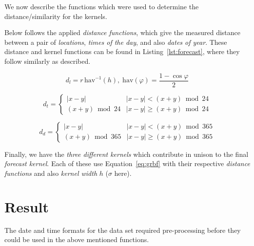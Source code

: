 \documentclass[a4paper, twocolumn]{article}
\begin{document}
    We now describe the functions which were used to determine the distance/similarity for the kernels.

    Below follows the applied \emph{distance functions}, which give the measured distance between a pair of \emph{locations}, \emph{times of the day}, and also \emph{dates of year}. These distance and kernel functions can be found in Listing~\ref{lst:forecast}, where they follow similarly as described.

    \begin{equation*} \label{eq:location}
    d_l = r\, \mathrm{hav}^{-1}(h),\; \mathrm{hav}(\varphi) = \frac{1 - \cos\varphi}{2}
    \end{equation*}
    
    
    
    \begin{equation*} \label{eq:time}
    d_t = \begin{cases}
    |x - y| & |x - y| < (x + y) \bmod 24\\
    (x + y) \bmod 24 & |x - y| \geq (x + y) \bmod 24
    \end{cases}
    \end{equation*}

   

    \begin{equation*} \label{eq:day}
    d_d = \begin{cases}
    |x - y| & |x - y| < (x + y) \bmod 365\\
    (x + y) \bmod 365 & |x - y| \geq (x + y) \bmod 365
    \end{cases}
    \end{equation*}

   
    

    Finally, we have the \emph{three different kernels} which contribute in unison to the final \emph{forecast kernel}. Each of these use Equation~\ref{eq:grbf} with their respective \emph{distance functions} and also \emph{kernel width} \(h\) (\(\sigma\) here).


    \section{Result}

    The date and time formats for the data set required pre-processing before they could be used in the above mentioned functions.
    
\end{document}
